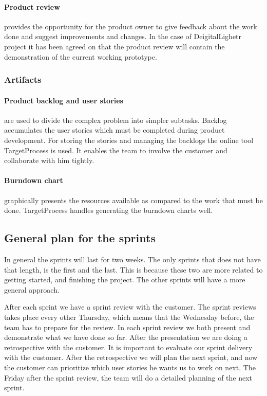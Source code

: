 \paragraph{Product review} provides the opportunity for the product owner to give feedback about the work done and suggest improvements and changes. In the case of DeigitalLighetr project it has been agreed on that the product review will contain the demonstration of the current working prototype.

\subsubsection{Artifacts}

\paragraph{Product backlog and user stories} are used to divide the complex problem into simpler subtasks. Backlog accumulates the user stories which must be completed during product development. For storing the stories and managing the backlogs the online tool TargetProcess is used. It enables the team to involve the customer and collaborate with him tightly.

\paragraph{Burndown chart} graphically presents the resources available as compared to the work that must be done. TargetProcess handles generating the burndown charts well.


\subsection{General plan for the sprints}
In general the sprints will last for two weeks. The only sprints that does not have that length, is the first and the last. This is because these two are more related to getting started, and finishing the project. The other sprints will have a more general approach. 

After each sprint we have a sprint review with the customer. The sprint reviews takes place every other Thursday, which means that the Wednesday before, the team has to prepare for the review. In each sprint review we both present and demonstrate what we have done so far. After the presentation we are doing a retrospective with the customer. It is important to evaluate our sprint delivery with the customer. After the retrospective we will plan the next sprint, and now the customer can prioritize which user stories he wants us to work on next. The Friday after the sprint review, the team will do a detailed planning of the next sprint. 

